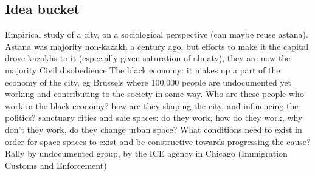 \documentclass{article}
\begin{document}
\subsection{Idea bucket}

\begin{outline}
	\1 Empirical study of a city, on a sociological perspective (can maybe reuse astana). Astana was majority non-kazakh a century ago, but efforts to make it the capital drove kazakhs to it (especially given saturation of almaty), they are now the majority
	\1 Civil disobedience 
	\1 The black economy: it makes up a part of the economy of the city, eg Brussels where 100.000 people are undocumented yet working and contributing to the society in some way. Who are these people who work in the black economy? how are they shaping the city, and influencing the politics?
	\1 sanctuary cities and safe spaces: do they work, how do they work, why don't they work, do they change urban space?
		\2 What conditions need to exist in order for space spaces to exist and be constructive towards progressing the cause?
		\2 Rally by undocumented group, by the ICE agency in Chicago (Immigration Customs and Enforcement)
\end{outline}


\begin{outline}
	\1
\end{outline}

\fi
\end{document}
